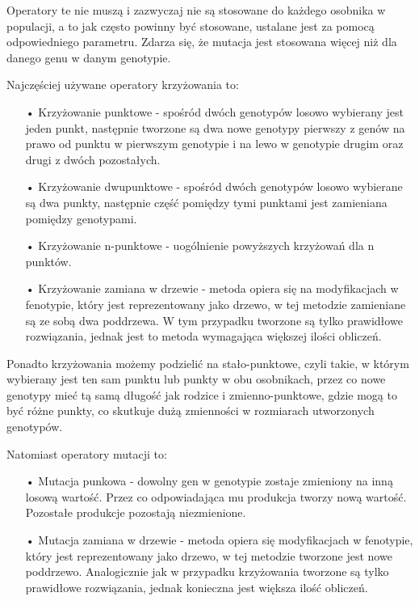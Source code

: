 Operatory te nie muszą i zazwyczaj nie są stosowane do każdego osobnika w populacji, a to jak często powinny być stosowane, ustalane jest za pomocą odpowiedniego parametru. Zdarza się, że mutacja jest stosowana więcej niż dla danego genu w danym genotypie.

Najczęściej używane operatory krzyżowania to:
\begin{itemize}
\item[•] Krzyżowanie punktowe - spośród dwóch genotypów losowo wybierany jest jeden punkt, następnie tworzone są dwa nowe genotypy pierwszy z genów na prawo od punktu w pierwszym genotypie i na lewo w genotypie drugim oraz drugi z dwóch pozostałych.

\item[•] Krzyżowanie dwupunktowe - spośród dwóch genotypów losowo wybierane są dwa punkty, następnie część pomiędzy tymi punktami jest zamieniana pomiędzy genotypami.

\item[•] Krzyżowanie n-punktowe - uogólnienie powyższych krzyżowań dla n punktów.

\item[•] Krzyżowanie zamiana w drzewie - metoda opiera się na modyfikacjach w fenotypie, który jest reprezentowany jako drzewo, w tej metodzie zamieniane są ze sobą dwa poddrzewa. W tym przypadku tworzone są tylko prawidłowe rozwiązania, jednak jest to metoda wymagająca większej ilości obliczeń.  
\end{itemize}
Ponadto krzyżowania możemy podzielić na stało-punktowe, czyli takie, w którym wybierany jest ten sam punktu lub punkty w obu osobnikach, przez co nowe genotypy mieć tą samą długość jak rodzice i zmienno-punktowe, gdzie mogą to być różne punkty, co skutkuje dużą zmienności w rozmiarach utworzonych genotypów. 

Natomiast operatory mutacji to:
\begin{itemize}
\item[•] Mutacja punkowa - dowolny gen w genotypie zostaje zmieniony na inną losową wartość. Przez co odpowiadająca mu produkcja tworzy nową wartość. Pozostałe produkcje pozostają niezmienione.

\item[•] Mutacja zamiana w drzewie - metoda opiera się modyfikacjach w fenotypie, który jest reprezentowany jako drzewo, w tej metodzie tworzone jest nowe poddrzewo. Analogicznie jak w przypadku krzyżowania tworzone są tylko prawidłowe rozwiązania, jednak konieczna jest większa ilość obliczeń. 
\end{itemize}

